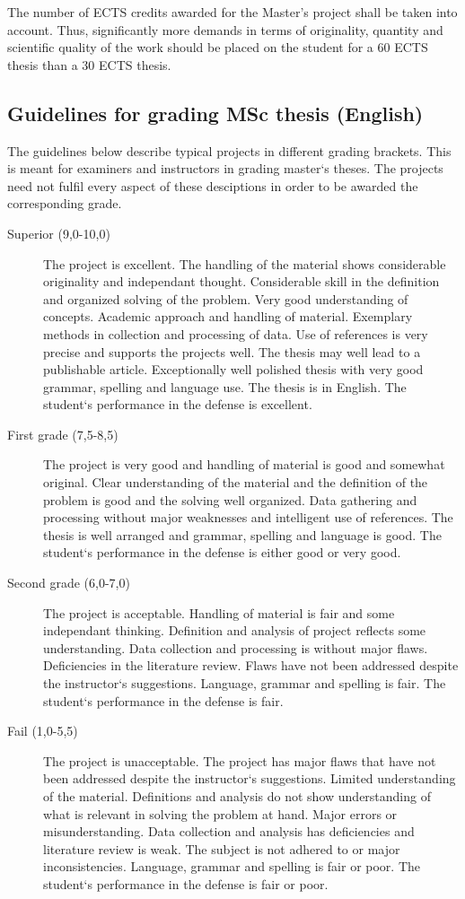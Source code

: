 The number of ECTS credits awarded for the Master’s project shall be taken into account.  
Thus, significantly more demands in terms of originality, quantity and scientific quality of the work should be placed on the student for a 60 ECTS thesis than a 30 ECTS thesis.

\subsection{Guidelines for grading MSc thesis (English)}
The guidelines below describe typical projects in different grading brackets.  
This is meant for
examiners and instructors in grading master‘s theses.  
The projects need not fulfil every aspect of
these desciptions in order to be awarded the corresponding grade.
\begin{description}
\item [Superior (9,0-10,0)]
  The project is excellent.  
The handling of the material shows considerable originality and independant thought.
  Considerable skill in the definition and organized solving of the problem.
  Very good understanding of concepts.
  Academic approach and handling of material.
  Exemplary methods in collection and processing of data.
  Use of references is very precise and supports the projects well.
  The thesis may well lead to a publishable article.
  Exceptionally well polished thesis with very good grammar, spelling and language use.
  The thesis is in English.
  The student‘s performance in the defense is excellent.
\item[First grade (7,5-8,5)]
  The project is very good and handling of material is good and somewhat original.
  Clear understanding of the material and the definition of the problem is good and the solving well organized.
  Data gathering and processing without major weaknesses and intelligent use of references.
  The thesis is well arranged and grammar, spelling and language is good.
  The student‘s performance in the defense is either good or very good.
\item[Second grade (6,0-7,0)]
  The project is acceptable.
  Handling of material is fair and some independant thinking.
  Definition and analysis of project reflects some understanding.
  Data collection and processing is without major flaws.
  Deficiencies in the literature review.
  Flaws have not been addressed despite the instructor‘s suggestions.
  Language, grammar and spelling is fair.
  The student‘s performance in the defense is fair.
\item[Fail (1,0-5,5)]
  The project is unacceptable.
  The project has major flaws that have not been addressed despite the instructor‘s suggestions.
  Limited understanding of the material.
  Definitions and analysis do not show understanding of what is relevant in solving the problem at hand.  
Major errors or misunderstanding.
  Data collection and analysis has deficiencies and literature review is weak.
  The subject is not adhered to or major inconsistencies.
  Language, grammar and spelling is fair or poor.
  The student‘s performance in the defense is fair or poor.
\end{description}

